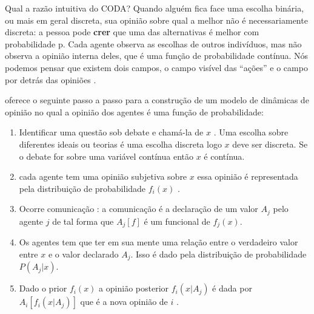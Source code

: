 Qual a razão intuitiva do CODA?  Quando alguém fica face uma escolha
binária, ou mais em geral discreta, sua opinião sobre qual a melhor
não é necessariamente discreta: a pessoa pode \textbf{crer} que uma
das alternativas é melhor com probabilidade p. Cada agente observa as
escolhas de outros indivíduos, mas não observa a opinião interna
deles, que é uma função de probabilidade contínua. Nós podemos pensar
que existem dois campos, o campo visível das ``ações'' e o campo por
detrás das opiniões \cite{martins2008continuous}.

  oferece o seguinte passo a passo
para a construção de um modelo de dinâmicas de opinião no qual a opinião dos
agentes é uma função de probabilidade:

\begin{enumerate}
\item Identificar uma questão sob debate e chamá-la de $x$ . Uma
  escolha sobre diferentes ideais ou teorias é uma escolha discreta
  logo $x$ deve ser discreta. Se o debate for sobre uma variável
  contínua então $x$ é contínua.
\item cada agente tem uma opinião subjetiva sobre $x$ essa opinião é
  representada pela distribuição de probabilidade $f_i(x)$ .
\item Ocorre comunicação : a comunicação é a declaração de um valor
  $ A_j$ pelo agente $j$ de tal forma que $A_j[f]$ é um funcional de
  $f_j(x)$.
\item Os agentes tem que ter em sua mente  uma relação entre o
  verdadeiro valor entre $x$ e o valor declarado $A_j$. Isso é dado
  pela distribuição de probabilidade $P(A_j|x)$.
\item Dado o prior $f_i(x)$ a opinião posterior $f_i(x|A_j)$ é dada
  por $A_i[f_i(x|A_j)]$ que é a nova opinião de $i$ .
\end{enumerate}
